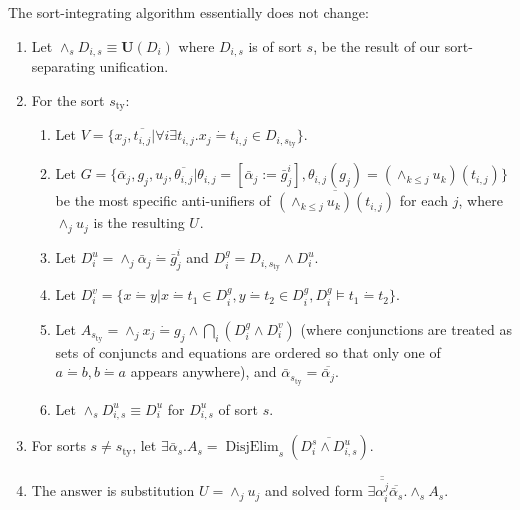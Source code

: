 \documentclass{article}
\newcommand{\assign}{:=}
\newcommand{\tmmathbf}[1]{\ensuremath{\boldsymbol{#1}}}
\newcommand{\tmop}[1]{\ensuremath{\operatorname{#1}}}
\begin{document}
The sort-integrating algorithm essentially does not change:
\begin{enumerate}
  \item Let $\wedge_s D_{i, s} \equiv \tmmathbf{U} (D_i)$ where $D_{i, s}$ is
  of sort $s$, be the result of our sort-separating unification.
  
  \item For the sort $s_{\tmop{ty}}$:
  \begin{enumerate}
    \item Let $V = \{ x_j, \overline{t_{i, j}} | \forall i \exists t_{i, j}
    .x_j \dot{=} t_{i, j} \in D_{i, s_{\tmop{ty}}} \}$.
    
    \item Let $G = \{ \bar{\alpha}_j, g_j, u_j, \overline{\theta_{i, j}} |
    \theta_{i, j} = [\bar{\alpha}_j \assign \bar{g}_j^i], \theta_{i, j} (g_j)
    = (\wedge_{k \leqslant j} u_k) (t_{i, j}) \}$ be the most specific
    anti-unifiers of $\overline{_{} (\wedge_{k \leqslant j} u_k) (t_{i, j})}$
    for each $j$, where $\wedge_j u_j$ is the resulting $U_{}$.
    
    \item Let $D_i^u = \wedge_j \bar{\alpha}_j \dot{=} \bar{g}_j^i$ and $D_i^g
    = D_{i, s_{\tmop{ty}}} \wedge D_i^u$.
    
    \item Let $D^v_i = \{ x \dot{=} y | x \dot{=} t_1 \in D_i^g, y \dot{=} t_2
    \in D_i^g, D_i^g \vDash t_1 \dot{=} t_2 \}$.
    
    \item Let $A_{s_{\tmop{ty}}} = \wedge_j x_j \dot{=} g_j \wedge \bigcap_i
    (D_i^g \wedge D_i^v)$ (where conjunctions are treated as sets of conjuncts
    and equations are ordered so that only one of $a \dot{=} b, b \dot{=} a$
    appears anywhere), and $\bar{\alpha}_{s_{\tmop{ty}}} =
    \overline{\bar{\alpha}_j}$.
    
    \item Let $\wedge_s D^u_{i, s} \equiv D^u_i$ for $D^u_{i, s}$ of sort $s$.
  \end{enumerate}
  \item For sorts $s \neq s_{\tmop{ty}}$, let $\exists \bar{\alpha}_s .A_s =
  \tmop{DisjElim}_s (\overline{D_i^s \wedge D^u_{i, s}})$.
  
  \item The answer is substitution $U = \wedge_j u_j$ and solved form $\exists
  \overline{\overline{\alpha^j_i}} \overline{\bar{\alpha}_s} . \wedge_s A_s$.
\end{enumerate}
\end{document}
